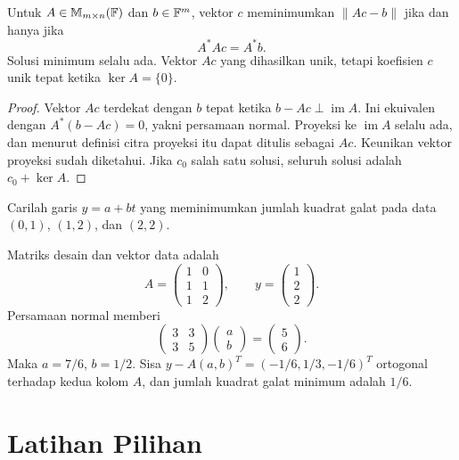 \begin{teorema}
    Untuk $A\in\mathbb{M}_{m\times n}(\mathbb{F})$ dan $b\in\mathbb{F}^m$, vektor
    $c$ meminimumkan $\|Ac-b\|$ jika dan hanya jika
    \[
        A^*Ac=A^*b.
    \]
    Solusi minimum selalu ada. Vektor $Ac$ yang dihasilkan unik,
    tetapi koefisien $c$ unik tepat ketika $\ker A=\{0\}$.
\end{teorema}
\begin{proof}
    Vektor $Ac$ terdekat dengan $b$ tepat ketika
    $b-Ac\perp\operatorname{im}A$.
    Ini ekuivalen dengan $A^*(b-Ac)=0$, yakni persamaan normal.
    Proyeksi ke $\operatorname{im}A$ selalu ada, dan menurut
    definisi citra proyeksi itu dapat ditulis sebagai $Ac$.
    Keunikan vektor proyeksi sudah diketahui. Jika $c_0$ salah
    satu solusi, seluruh solusi adalah $c_0+\ker A$.
\end{proof}

\begin{exam}
    Carilah garis $y=a+bt$ yang meminimumkan jumlah kuadrat
    galat pada data $(0,1)$, $(1,2)$, dan $(2,2)$.
\end{exam}
\begin{solution}
    Matriks desain dan vektor data adalah
    \[
        A=\begin{pmatrix}1&0\\1&1\\1&2\end{pmatrix},\qquad
        y=\begin{pmatrix}1\\2\\2\end{pmatrix}.
    \]
    Persamaan normal memberi
    \[
        \begin{pmatrix}3&3\\3&5\end{pmatrix}
        \begin{pmatrix}a\\b\end{pmatrix}
        =\begin{pmatrix}5\\6\end{pmatrix}.
    \]
    Maka $a=7/6$, $b=1/2$.
    Sisa $y-A(a,b)^T=(-1/6,1/3,-1/6)^T$ ortogonal terhadap
    kedua kolom $A$, dan jumlah kuadrat galat minimum adalah $1/6$.
\end{solution}

\section{Latihan Pilihan}

